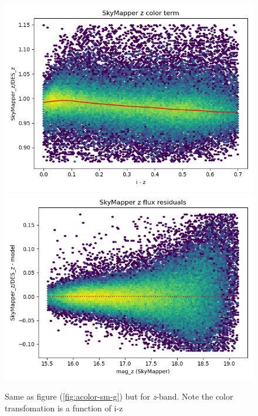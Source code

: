 \begin{figure}
    \includegraphics[width=0.49\linewidth]{./figures/color_terms/SkyMapper_to_DES_band_z_color_term.png}
    \includegraphics[width=0.49\linewidth]{./figures/color_terms/SkyMapper_to_DES_band_z_flux_residuals.png}
    \caption{Same as figure (\ref{fig:acolor-sm-g}) but for \textit{z}-band. Note the color transfomation is a function of i-z}
\end{figure}

\clearpage

